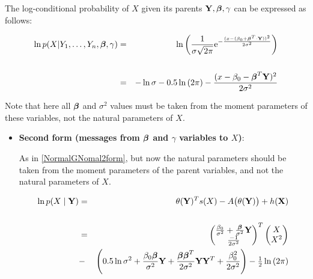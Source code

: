\documentclass[11pt, oneside]{article}   	%
\newcommand{\bm}{\mathbf}
\newcommand{\bs}{\boldsymbol}
\newcommand{\me}{\mathrm{e}}
\numberwithin{figure}{section}
\numberwithin{equation}{section}
\numberwithin{table}{section}
\theoremstyle{definition}
\begin{document}
\begin{appendices}
The log-conditional probability of $X$ given its parents $\mathbf{Y}, \beb, \gamma$ can be expressed as follows:

\begin{eqnarray*}
\ln p(X|Y_1,\ldots,Y_n,\beb,\gamma) &=& \ln \left(\frac{1}{\sigma \sqrt{2\pi}} \me^{-\frac{(x-(\beta_0+ \bs \beta^T \cdot \bm Y))^2}{2\sigma^2}} \right)\\\\
&=&
- \ln{\sigma} - 0.5\ln{(2\pi)} - \frac{(x-\beta_0 - \bs \beta^T \mathbf{Y})^2}{2\sigma^2}
\end{eqnarray*}


Note that here all $\beb$ and $\sigma^2$ values must be taken from the moment parameters of these variables, not the natural parameters of $X$.

\begin{itemize} 

\item \textbf{Second form (messages from $\beb$ and $\gamma$ variables to $X$)}:

As in \ref{NormalGNomal2form}, but now the natural parameters should be taken from the moment parameters of the parent variables, and not the natural parameters of $X$.

\begin{eqnarray*}
\ln p(X\mid \mathbf{Y}) &=& \theta(\mathbf{Y})^T s(X) - A \big(\theta(\mathbf{Y})\big) + h(\mathbf{X})\\\\
&=&
\begin{pmatrix}
\frac{\beta_0}{\sigma^2} + \frac{\beb}{\sigma^2} \Y\\
\frac{-1}{2\sigma^2}\\
\end{pmatrix}^T
\begin{pmatrix}
X \\
X^2 \\
\end{pmatrix}\\ 
&-& 
\left(0.5\ln{\sigma^2} + \frac{\beta_0\beb}{\sigma^2} \Y + \frac{\beb\beb^T}{2\sigma^2}\Y\Y^T +\frac{\beta_0^2}{2\sigma^2}\right) - \tfrac{1}{2}\ln{(2\pi)} 
\end{eqnarray*}


\end{itemize}
\end{appendices}
\end{document}
